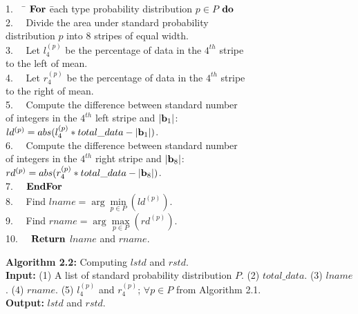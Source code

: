 \documentclass[lettersize,journal]{IEEEtran}
\begin{document}
\vspace{0.2in}
\noindent

\begin{tabbing}

1.~~ \= ${\bf For}$ \= each type probability distribution $p \in P$ ${\bf do}$ \\
2.~~ \>             \> Divide the area under standard probability \\
     \>             \> distribution $p$ into 8 stripes of equal width. \\
3.~~ \>             \> Let $l^{(p)}_{4}$ be the percentage of data in the $4^{th}$ stripe \\
     \>             \> to the left of mean. \\
4.~~ \>             \> Let $r^{(p)}_{4}$ be the percentage of data in the $4^{th}$ stripe \\
     \>             \> to the right of mean.\\
5.~~ \>             \> Compute the difference between standard number \\
     \>             \> of integers in the $4^{th}$ left stripe and $|{\bf b}_{1}|$: \\
     \>             \> $ld^{(p)} = abs(l^{(p)}_{4} * total\_data - |{\bf b}_{1}|)$. \\
6.~~ \>             \> Compute the difference between standard number \\
     \>             \> of integers in the $4^{th}$ right stripe and $|{\bf b}_{8}|$: \\
     \>             \> $rd^{(p)} = abs(r^{(p)}_{4} * total\_data - |{\bf b}_{8}|)$. \\
7.~~ \> ${\bf EndFor}$ \\
8.~~ \> Find $lname = \arg \min\limits_{p \in P} (ld^{(p)})$. \\
9.~~ \> Find $rname = \arg \max\limits_{p \in P} (rd^{(p)})$. \\
10.~~\> ${\bf Return}$ $lname$ and $rname$.
\end{tabbing}

\vspace{0.2in}
\noindent
{\bf Algorithm 2.2:} Computing $lstd$ and $rstd$. \\

\noindent
{\bf Input:} (1) A list of standard probability distribution $P$. (2) $total\_data$. (3) $lname$.
(4) $rname$. (5) $l^{(p)}_{4}$ and $r^{(p)}_{4}$; $\forall p \in P$ from Algorithm 2.1. \\
{\bf Output:} $lstd$ and $rstd$.
\end{document}
